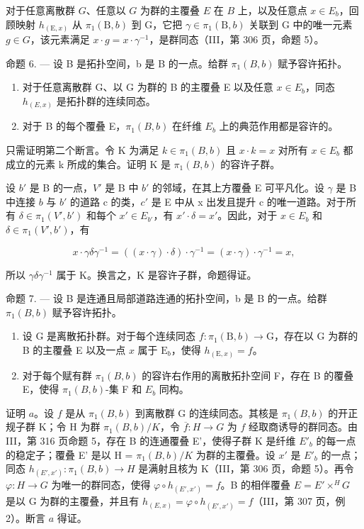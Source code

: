 对于任意离散群 \(G\)、任意以 \(G\) 为群的主覆叠 \(E\) 在 \(B\) 上，以及任意点 \(x \in E_{b}\)，回顾映射 \(h_{(\mathrm{E},x)}\) 从 \(\pi_{1}(\mathrm{B},b)\) 到 G，它把 \(\gamma \in \pi_{1}(\mathrm{B},b)\) 关联到 G 中的唯一元素 \(g \in G\)，该元素满足 \(x \cdot g = x \cdot \gamma^{-1}\)，是群同态（III，第 306 页，命题 5）。

命题 6. --- 设 B 是拓扑空间，b 是 B 的一点。给群 \(\pi_1(B, b)\) 赋予容许拓扑。

\begin{enumerate}
\def\labelenumi{\alph{enumi})}
\item
  对于任意离散群 G、以 G 为群的 B 的主覆叠 E 以及任意 \(x \in E_{b}\)，同态 \(h_{(E,x)}\) 是拓扑群的连续同态。
\item
  对于 B 的每个覆叠 E，\(\pi_{1}(B,b)\) 在纤维 \(E_{b}\) 上的典范作用都是容许的。
\end{enumerate}

只需证明第二个断言。令 K 为满足 \(k \in \pi_{1}(B, b)\) 且 \(x \cdot k = x\) 对所有 \(x \in E_{b}\) 都成立的元素 k 所成的集合。证明 K 是 \(\pi_{1}(B, b)\) 的容许子群。

设 \(b'\) 是 B 的一点，\(V'\) 是 B 中 \(b'\) 的邻域，在其上方覆叠 E 可平凡化。设 \(\gamma\) 是 B 中连接 \(b\) 与 \(b'\) 的道路 c 的类，\(c'\) 是 E 中从 x 出发且提升 c 的唯一道路。对于所有 \(\delta \in \pi_1(V', b')\) 和每个 \(x' \in E_{b'}\)，有 \(x' \cdot \delta = x'\)。因此，对于 \(x \in E_b\) 和 \(\delta \in \pi_1(V', b')\)，有

\[
x \cdot \gamma \delta \gamma^ {- 1} = ((x \cdot \gamma) \cdot \delta) \cdot \gamma^ {- 1} = (x \cdot \gamma) \cdot \gamma^ {- 1} = x,
\]

所以 \(\gamma\delta\gamma^{-1}\) 属于 K。换言之，K 是容许子群，命题得证。

命题 7. --- 设 B 是连通且局部道路连通的拓扑空间，b 是 B 的一点。给群 \(\pi_1(B, b)\) 赋予容许拓扑。

\begin{enumerate}
\def\labelenumi{\alph{enumi})}
\item
  设 G 是离散拓扑群。对于每个连续同态 \(f\colon \pi_{1}(\mathrm{B},b)\to \mathrm{G}\)，存在以 G 为群的 B 的主覆叠 E 以及一点 \(x\) 属于 \(\mathrm{E}_{b}\)，使得 \(h_{(\mathrm{E},x)} = f\)。
\item
  对于每个赋有群 \(\pi_{1}(B,b)\) 的容许右作用的离散拓扑空间 F，存在 B 的覆叠 E，使得 \(\pi_{1}(B,b)\)-集 F 和 \(E_{b}\) 同构。
\end{enumerate}

证明 \(a\)。设 \(f\) 是从 \(\pi_1(B, b)\) 到离散群 G 的连续同态。其核是 \(\pi_1(B, b)\) 的开正规子群 K；令 H 为群 \(\pi_1(B, b)/K\)，令 \(\overline{f} \colon H \to G\) 为 \(f\) 经取商诱导的群同态。由 III，第 316 页命题 5，存在 B 的连通覆叠 E'，使得子群 K 是纤维 \(E'_{b}\) 的每一点的稳定子；覆叠 E' 是以 H = \(\pi_1(B, b)/K\) 为群的主覆叠。设 \(x'\) 是 \(E'_{b}\) 的一点；同态 \(h_{(E', x')} \colon \pi_1(B, b) \to H\) 是满射且核为 K（III，第 306 页，命题 5）。再令 \(\varphi \colon H \to G\) 为唯一的群同态，使得 \(\varphi \circ h_{(E', x')} = f\)。B 的相伴覆叠 \(E = E' \times^{H} G\) 是以 G 为群的主覆叠，并且有 \(h_{(E, x)} = \varphi \circ h_{(E', x')} = f\)（III，第 307 页，例 2）。断言 \(a\) 得证。

